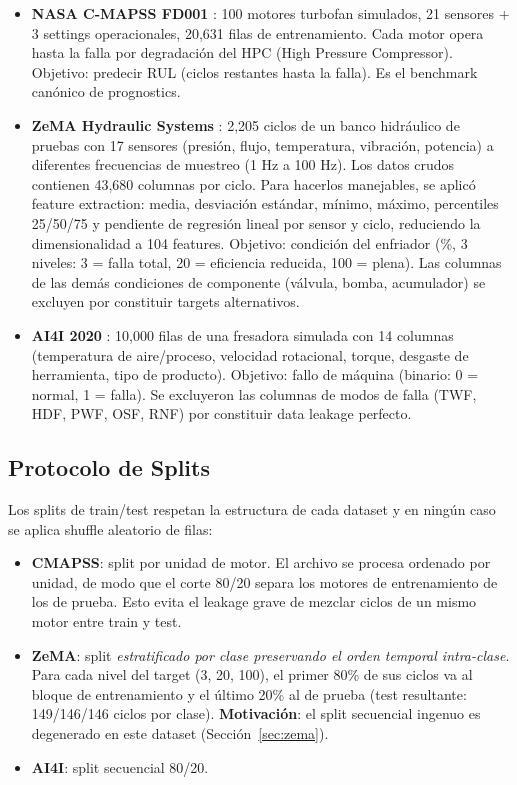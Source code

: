 \documentclass[10pt]{article}
\begin{document}
\begin{itemize}
    \item \textbf{NASA C-MAPSS FD001} \cite{saxena2008}: 100 motores turbofan simulados, 21 sensores + 3 settings operacionales, 20,631 filas de entrenamiento. Cada motor opera hasta la falla por degradación del HPC (High Pressure Compressor). Objetivo: predecir RUL (ciclos restantes hasta la falla). Es el benchmark canónico de prognostics.

    \item \textbf{ZeMA Hydraulic Systems} \cite{helwig2015}: 2,205 ciclos de un banco hidráulico de pruebas con 17 sensores (presión, flujo, temperatura, vibración, potencia) a diferentes frecuencias de muestreo (1 Hz a 100 Hz). Los datos crudos contienen 43,680 columnas por ciclo. Para hacerlos manejables, se aplicó feature extraction: media, desviación estándar, mínimo, máximo, percentiles 25/50/75 y pendiente de regresión lineal por sensor y ciclo, reduciendo la dimensionalidad a 104 features. Objetivo: condición del enfriador (\%, 3 niveles: 3 = falla total, 20 = eficiencia reducida, 100 = plena). Las columnas de las demás condiciones de componente (válvula, bomba, acumulador) se excluyen por constituir targets alternativos.

    \item \textbf{AI4I 2020} \cite{matzka2020}: 10,000 filas de una fresadora simulada con 14 columnas (temperatura de aire/proceso, velocidad rotacional, torque, desgaste de herramienta, tipo de producto). Objetivo: fallo de máquina (binario: 0 = normal, 1 = falla). Se excluyeron las columnas de modos de falla (TWF, HDF, PWF, OSF, RNF) por constituir data leakage perfecto.
\end{itemize}

\subsection{Protocolo de Splits}
\label{sec:splits}

Los splits de train/test respetan la estructura de cada dataset y en ningún caso se aplica shuffle aleatorio de filas:

\begin{itemize}
    \item \textbf{CMAPSS}: split por unidad de motor. El archivo se procesa ordenado por unidad, de modo que el corte 80/20 separa los motores de entrenamiento de los de prueba. Esto evita el leakage grave de mezclar ciclos de un mismo motor entre train y test.
    \item \textbf{ZeMA}: split \emph{estratificado por clase preservando el orden temporal intra-clase}. Para cada nivel del target (3, 20, 100), el primer 80\% de sus ciclos va al bloque de entrenamiento y el último 20\% al de prueba (test resultante: 149/146/146 ciclos por clase). \textbf{Motivación}: el split secuencial ingenuo es degenerado en este dataset (Sección~\ref{sec:zema}).
    \item \textbf{AI4I}: split secuencial 80/20.
\end{itemize}
\end{document}
